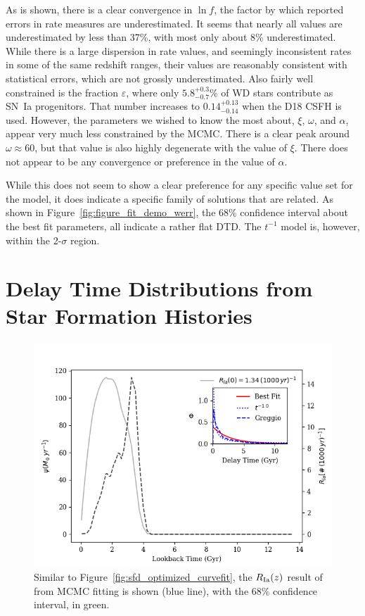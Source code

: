 \documentclass[apj]{aastex}
\begin{document}
As is shown, there is a clear convergence in $\ln f$, the factor by which reported errors in rate measures are underestimated. It seems that nearly all values are underestimated by less than 37\%, with most only about 8\% underestimated. While there is a large dispersion in rate values, and seemingly inconsistent rates in some of the same redshift ranges, their values are reasonably consistent with statistical errors, which are not grossly underestimated. Also fairly well constrained is the fraction $\varepsilon$, where only $5.8^{+0.3}_{-0.7}\%$ of WD stars contribute as SN~Ia progenitors. That number increases to  $0.14^{+0.13}_{-0.14}$ when the D18 CSFH is used. However, the parameters we wished to know the most about,  $\xi$, $\omega$, and $\alpha$, appear very much less constrained by the MCMC. There is a clear peak around $\omega\approx60$, but that value is also highly degenerate with the value of $\xi$.  There does not appear to be any convergence or preference in the value of $\alpha$.


While this does not seem to show a clear preference for any specific value set for the model, it does indicate a specific family of solutions that are related. As shown in Figure~\ref{fig:figure_fit_demo_werr}, the 68\% confidence interval about the best fit parameters, all indicate a rather flat DTD. The $t^{-1}$ model is, however, within the 2-$\sigma$ region. 


\section{Delay Time Distributions from Star Formation Histories}
\begin{figure}[t] %
   \centering
   \includegraphics[width=6.5in]{figure_sfh_demo} 
   \caption{\footnotesize Similar to Figure~\ref{fig:sfd_optimized_curvefit}, the $R_{\rm Ia}(z)$ result of from MCMC fitting is shown (blue line), with the 68\% confidence interval, in green. }
   \label{fig:figure_sfh_fit_demo}
\end{figure}
\end{document}
